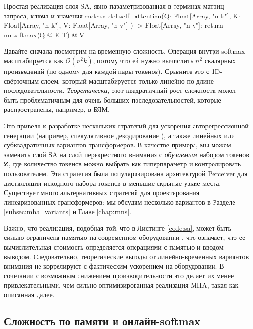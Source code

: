 \begin{mypy}{Простая реализация слоя SA, явно параметризованная в терминах матриц запроса, ключа и значения.}{code:sa}
def self_attention(Q: Float[Array, "n k"], 
                   K: Float[Array, "n k"], 
                   V: Float[Array, "n v"]
                 ) -> Float[Array, "n v"]:
	return nn.softmax(Q @ K.T) @ V
\end{mypy}

Давайте сначала посмотрим на временную сложность. Операция внутри softmax масштабируется как $\mathcal{O}(n^2k)$, потому что ей нужно вычислить $n^2$ скалярных произведений (по одному для каждой пары токенов). Сравните это с 1D-свёрточным слоем, который масштабируется только линейно по длине последовательности. \textit{Теоретически}, этот квадратичный рост сложности может быть проблематичным для очень больших последовательностей, которые распространены, например, в БЯМ. 

Это привело к разработке нескольких стратегий для ускорения авторегрессионной генерации (например, спекулятивное декодирование \cite{leviathan2023fast}), а также линейных или субквадратичных вариантов трансформеров. В качестве примера, мы можем заменить слой SA на слой перекрестного внимания с \textit{обучаемым} набором токенов $\mathbf{Z}$, где количество токенов можно выбрать как гиперпараметр и контролировать пользователем. Эта стратегия была популяризирована архитектурой Perceiver \cite{jaegle2021perceiver} для дистилляции исходного набора токенов в меньшие скрытые узкие места. Существует много альтернативных стратегий для проектирования линеаризованных трансформеров: мы обсудим несколько вариантов в Разделе \ref{subsec:mha_variants} и Главе \ref{chap:rnns}.

Важно, что реализация, подобная той, что в Листинге \ref{code:sa}, может быть сильно ограничена памятью на современном оборудовании \cite{dao2022flashattention}, что означает, что ее вычислительная стоимость определяется операциями с памятью и вводом-выводом. Следовательно, теоретические выгоды от линейно-временных вариантов внимания не коррелируют с фактическим ускорением на оборудовании. В сочетании с возможным снижением производительности это делает их менее привлекательными, чем сильно оптимизированная реализация MHA, такая как описанная далее.

\subsection{Сложность по памяти и онлайн-softmax}

